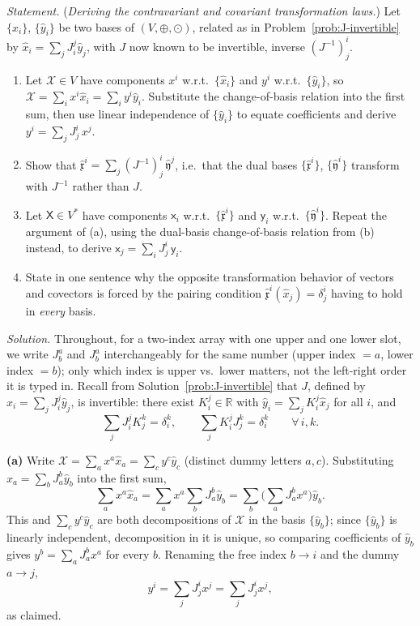 \documentclass[11pt]{article}
\newcommand{\Vsp}{(V, \oplus, \odot)}
\newcommand{\dual}{V^{*}}
\begin{document}
\noindent\textit{Statement.} (\textit{Deriving the contravariant and covariant transformation laws.})
Let $\{\hat{x}_i\}$, $\{\hat{y}_i\}$ be two bases of $\Vsp$, related as in Problem~\ref{prob:J-invertible} by $\hat{x}_i = \sum_j J_i^j \hat{y}_j$, with $J$ now known to be invertible, inverse $(J^{-1})^i_j$.
\begin{enumerate}[label=(\alph*)]
  \item Let $\mathcal{X}\in V$ have components $x^i$ w.r.t.\ $\{\hat x_i\}$ and $y^i$ w.r.t.\ $\{\hat y_i\}$, so $\mathcal X=\sum_i x^i\hat x_i=\sum_i y^i\hat y_i$. Substitute the change-of-basis relation into the first sum, then use linear independence of $\{\hat y_i\}$ to equate coefficients and derive $y^i=\sum_j J^i_j\,x^j$.
  \item Show that $\hat{\mathfrak{x}}^i=\sum_j(J^{-1})^i_j\,\hat{\mathfrak{y}}^j$, i.e.\ that the dual bases $\{\hat{\mathfrak x}^i\}$, $\{\hat{\mathfrak y}^i\}$ transform with $J^{-1}$ rather than $J$.
  \item Let $\mathsf X\in\dual$ have components $\mathsf x_i$ w.r.t.\ $\{\hat{\mathfrak x}^i\}$ and $\mathsf y_i$ w.r.t.\ $\{\hat{\mathfrak y}^i\}$. Repeat the argument of (a), using the dual-basis change-of-basis relation from (b) instead, to derive $\mathsf x_j=\sum_i J^i_j\,\mathsf y_i$.
  \item State in one sentence why the opposite transformation behavior of vectors and covectors is forced by the pairing condition $\hat{\mathfrak x}^i(\hat x_j)=\delta^i_j$ having to hold in \emph{every} basis.
\end{enumerate}

\medskip
\noindent\textit{Solution.} Throughout, for a two-index array with one upper and one lower slot, we write $J^a_b$ and $J_b^a$ interchangeably for the same number (upper index $=a$, lower index $=b$); only which index is upper vs.\ lower matters, not the left-right order it is typed in. Recall from Solution~\ref{prob:J-invertible} that $J$, defined by $\hat x_i=\sum_jJ_i^j\hat y_j$, is invertible: there exist $K_i^j\in\mathbb R$ with $\hat y_i=\sum_jK_i^j\hat x_j$ for all $i$, and
\[
\sum_jJ_i^jK_j^k=\delta_i^k, \qquad \sum_jK_i^jJ_j^k=\delta_i^k \qquad \forall\, i,k.
\]

\textbf{(a)} Write $\mathcal X=\sum_a x^a\hat x_a=\sum_cy^c\hat y_c$ (distinct dummy letters $a,c$). Substituting $\hat x_a=\sum_bJ_a^b\hat y_b$ into the first sum,
\[
\sum_ax^a\hat x_a=\sum_ax^a\sum_bJ_a^b\hat y_b=\sum_b\Big(\sum_aJ_a^bx^a\Big)\hat y_b.
\]
This and $\sum_cy^c\hat y_c$ are both decompositions of $\mathcal X$ in the basis $\{\hat y_b\}$; since $\{\hat y_b\}$ is linearly independent, decomposition in it is unique, so comparing coefficients of $\hat y_b$ gives $y^b=\sum_aJ_a^bx^a$ for every $b$. Renaming the free index $b\to i$ and the dummy $a\to j$,
\[
y^i=\sum_jJ_j^ix^j=\sum_jJ^i_jx^j,
\]
as claimed.
\end{document}
